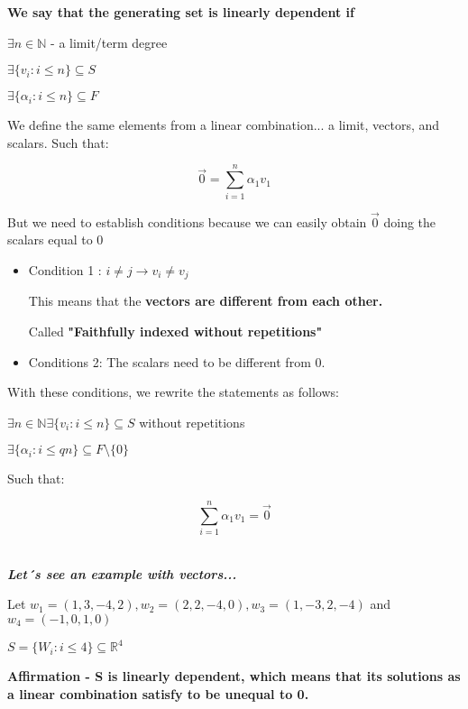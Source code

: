 \documentclass{article}
\begin{document}
\textbf{We say that the generating set is linearly dependent if}

\(\exists n \in \mathbb{N}\) - a limit/term degree

\(\exists \{ v_i : i \leq n\} \subseteq S\)

\(\exists \{ \alpha_i : i \leq n\} \subseteq F\)

We define the same elements from a linear combination... a limit, vectors, and scalars. Such that:

\[
\vec{0} = \sum_{i=1}^{n} \alpha_1 v_1 
\]

But we need to establish conditions because we can easily obtain \(\vec{0}\) doing the scalars equal to 0
\\
\begin{itemize}
    \item Condition 1 : \(i \neq j \rightarrow v_i \neq v_j\) 

This means that the \textbf{vectors are different from each other.} 

Called \textbf{"Faithfully indexed without repetitions"}
\\

    \item Conditions 2: The scalars need to be different from 0. 
\end{itemize}

With these conditions, we rewrite the statements as follows:

\(\exists n \in \mathbb{N}

\exists \{v_i : i \leq n \} \subseteq S\) without repetitions

\(\exists \{\alpha_i : i \le qn \} \subseteq F \text{\textbackslash}
 \{0\}\)

Such that:

\[
\sum_{i=1}^{n} \alpha_1 v_1 = \vec{0}
\]

\\

\textbf{\textit{Let´s see an example with vectors...}}

Let \(w_1 = (1,3,-4,2), w_2 = (2,2,-4,0), w_3=(1,-3,2,-4)\) and \(w_4=(-1,0,1,0)\)

\(S=\{W_i : i \leq 4\} \subseteq \mathbb{R}^4\)

\textbf{Affirmation - S is linearly dependent, which means that its solutions as a linear combination satisfy to be unequal to 0.}
\\
\end{document}
